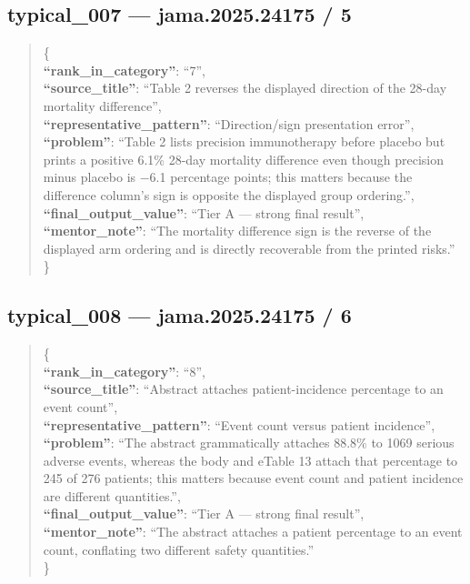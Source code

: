 \documentclass[
  letterpaper,
  9pt]{extreport}
\begin{document}
\hypertarget{typical_007--jama202524175--5}{%
\subsection{typical\_007 --- jama.2025.24175 /
5}\label{typical_007--jama202524175--5}}

\begin{quote}
\{\\
\textbf{``rank\_in\_category''}: ``7'',\\
\textbf{``source\_title''}: ``Table 2 reverses the displayed direction
of the 28-day mortality difference'',\\
\textbf{``representative\_pattern''}: ``Direction/sign presentation
error'',\\
\textbf{``problem''}: ``Table 2 lists precision immunotherapy before
placebo but prints a positive 6.1\% 28-day mortality difference even
though precision minus placebo is −6.1 percentage points; this matters
because the difference column's sign is opposite the displayed group
ordering.'',\\
\textbf{``final\_output\_value''}: ``Tier A --- strong final result'',\\
\textbf{``mentor\_note''}: ``The mortality difference sign is the
reverse of the displayed arm ordering and is directly recoverable from
the printed risks.''\\
\}
\end{quote}

\hypertarget{typical_008--jama202524175--6}{%
\subsection{typical\_008 --- jama.2025.24175 /
6}\label{typical_008--jama202524175--6}}

\begin{quote}
\{\\
\textbf{``rank\_in\_category''}: ``8'',\\
\textbf{``source\_title''}: ``Abstract attaches patient-incidence
percentage to an event count'',\\
\textbf{``representative\_pattern''}: ``Event count versus patient
incidence'',\\
\textbf{``problem''}: ``The abstract grammatically attaches 88.8\% to
1069 serious adverse events, whereas the body and eTable 13 attach that
percentage to 245 of 276 patients; this matters because event count and
patient incidence are different quantities.'',\\
\textbf{``final\_output\_value''}: ``Tier A --- strong final result'',\\
\textbf{``mentor\_note''}: ``The abstract attaches a patient percentage
to an event count, conflating two different safety quantities.''\\
\}
\end{quote}
\end{document}
